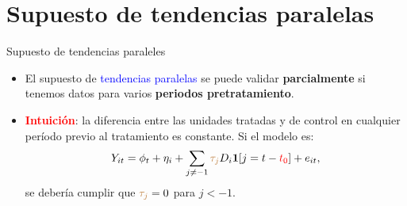 \documentclass[10pt, xcolor=dvipsnames]{beamer}
\begin{document}
\section{Supuesto de tendencias paralelas}

\begin{frame}{Supuesto de tendencias paraleles}
\begin{itemize}\setlength{\itemsep}{1.0em}
	\item El supuesto de \textcolor{blue}{tendencias paralelas} se puede validar \textbf{parcialmente} si tenemos datos para varios \textbf{periodos pretratamiento}.
	\smallspace
	\item \textcolor{red}{\textbf{Intuición}}: la diferencia entre las unidades tratadas y de control en cualquier período previo al tratamiento es constante. Si el modelo es:
    \begin{align*}
        Y_{it} = \phi_t + \eta_i + \sum_{j \neq -1} \textcolor{brown}{\tau_j} D_i \mathbf{1}[j=t-\textcolor{red}{t_0}] + e_{it},
    \end{align*}
    se debería cumplir que \(\textcolor{brown}{\tau_j} = 0\) para \(j < -1\).      	
\end{itemize}
\end{frame}
\end{document}
